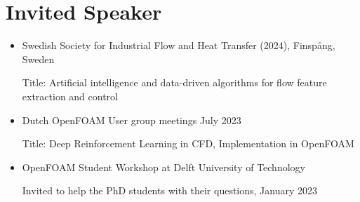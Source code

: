 \section{Invited Speaker}{}
\begin{itemize}[itemsep=0pt]
    \item Swedish Society for Industrial Flow and Heat Transfer (2024), Finspång, Sweden
         
    Title: Artificial intelligence and data-driven algorithms for flow feature extraction and control

    \item Dutch OpenFOAM User group meetings July 2023

    Title: Deep Reinforcement Learning in CFD, Implementation in OpenFOAM
    
    \item OpenFOAM Student Workshop at Delft University of Technology
    
    Invited to help the PhD students with their questions, January 2023
    
\end{itemize}
